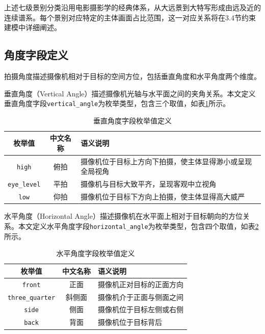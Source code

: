上述七级景别分类沿用电影摄影学的经典体系，从大远景到大特写形成由远及近的连续谱系。每个景别对应特定的主体画面占比范围，这一对应关系将在3.4节约束建模中详细阐述。

\subsection{角度字段定义}

拍摄角度描述摄像机相对于目标的空间方位，包括垂直角度和水平角度两个维度。

垂直角度（Vertical Angle）描述摄像机光轴与水平面之间的夹角关系。本文定义垂直角度字段\texttt{vertical\_angle}为枚举类型，包含三个取值，如表\ref{tab:vertical_angle_enum}所示。

\begin{table}[htbp]
\centering
\caption{垂直角度字段枚举值定义}
\label{tab:vertical_angle_enum}
\begin{tabular}{ccp{8cm}}
\toprule
枚举值 & 中文名称 & 语义说明 \\
\midrule
\texttt{high} & 俯拍 & 摄像机位于目标上方向下拍摄，使主体显得渺小或呈现全局视角 \\
\texttt{eye\_level} & 平拍 & 摄像机与目标大致平齐，呈现客观中立视角 \\
\texttt{low} & 仰拍 & 摄像机位于目标下方向上拍摄，使主体显得高大威严 \\
\bottomrule
\end{tabular}
\end{table}

水平角度（Horizontal Angle）描述摄像机在水平面上相对于目标朝向的方位关系。本文定义水平角度字段\texttt{horizontal\_angle}为枚举类型，包含四个取值，如表\ref{tab:horizontal_angle_enum}所示。

\begin{table}[htbp]
\centering
\caption{水平角度字段枚举值定义}
\label{tab:horizontal_angle_enum}
\begin{tabular}{ccp{8cm}}
\toprule
枚举值 & 中文名称 & 语义说明 \\
\midrule
\texttt{front} & 正面 & 摄像机正对目标的正面方向\\
\texttt{three\_quarter} & 斜侧面 & 摄像机介于正面与侧面之间\\
\texttt{side} & 侧面 & 摄像机位于目标左侧或右侧\\
\texttt{back} & 背面 & 摄像机位于目标背后\\
\bottomrule
\end{tabular}
\end{table}


